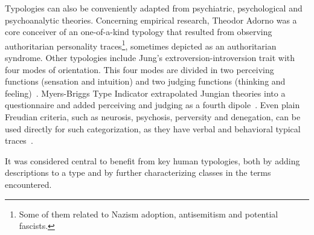 \documentclass[%
 aip,
 jmp,%
 amsmath,amssymb,
 reprint,%
]{revtex4-1}
\begin{document}
Typologies can also be conveniently adapted from psychiatric, psychological and psychoanalytic theories. 
Concerning empirical research,
Theodor Adorno was a core conceiver of an one-of-a-kind typology that resulted from observing authoritarian
personality traces\footnote{Some of them related to Nazism adoption, antisemitism and potential fascists.}, sometimes depicted as an authoritarian syndrome.
 Other typologies include Jung's extroversion-introversion trait with four modes of orientation. This four modes are divided in two perceiving functions (sensation and intuition) and two judging functions (thinking and feeling)~\cite{jung}. Myers-Briggs Type Indicator extrapolated Jungian theories into a questionnaire and added perceiving and judging as a fourth dipole~\cite{myers}. Even plain Freudian criteria, such as neurosis, psychosis, perversity and denegation, can be used directly for such categorization, as they have verbal and behavioral typical traces~\cite{freud,freud2}.

It was considered central to benefit from key human typologies, both by adding descriptions to a type and by further characterizing classes in the terms encountered.


%
\end{document}
